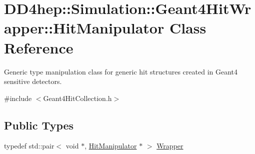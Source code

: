 \hypertarget{class_d_d4hep_1_1_simulation_1_1_geant4_hit_wrapper_1_1_hit_manipulator}{
\section{DD4hep::Simulation::Geant4HitWrapper::HitManipulator Class Reference}
\label{class_d_d4hep_1_1_simulation_1_1_geant4_hit_wrapper_1_1_hit_manipulator}
}


Generic type manipulation class for generic hit structures created in Geant4 sensitive detectors.  


{\ttfamily \#include $<$Geant4HitCollection.h$>$}\subsection*{Public Types}
\begin{DoxyCompactItemize}
\item 
typedef std::pair$<$ void $\ast$, \hyperlink{class_d_d4hep_1_1_simulation_1_1_geant4_hit_wrapper_1_1_hit_manipulator}{HitManipulator} $\ast$ $>$ \hyperlink{class_d_d4hep_1_1_simulation_1_1_geant4_hit_wrapper_1_1_hit_manipulator_a4bb62cc7e4979a8d0aea281477a4e38e}{Wrapper}
\end{DoxyCompactItemize}

